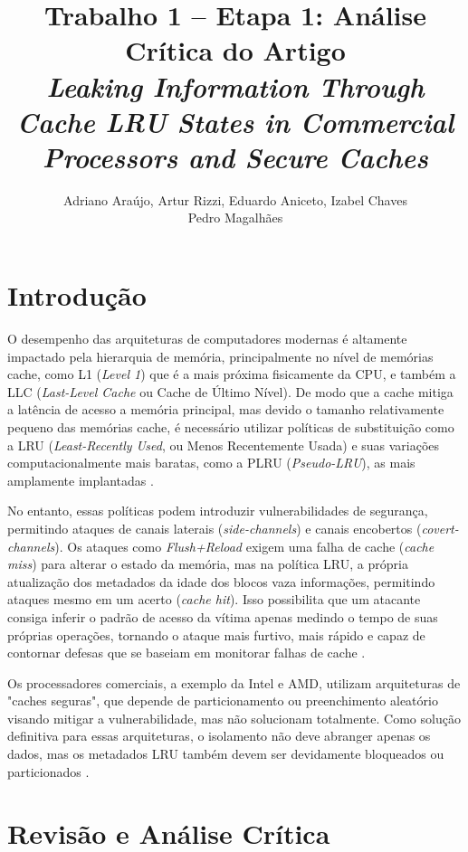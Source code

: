 \documentclass[12pt]{article}
\title{
Trabalho 1 -- Etapa 1: Análise Crítica do Artigo\\[0.2cm]
{\normalsize\itshape Leaking Information Through Cache LRU States in Commercial Processors and Secure Caches \cite{9354935}}
}
\author{Adriano Araújo\inst{1}, Artur Rizzi\inst{1}, Eduardo Aniceto\inst{1}, Izabel Chaves\inst{1}\orcidlink{0009-0008-9198-3909} \\ Pedro Magalhães\inst{1}}
\begin{document}
 

\maketitle

\section{Introdução}

O desempenho das arquiteturas de computadores modernas é altamente impactado pela hierarquia de memória, principalmente no nível de memórias cache, como L1 (\textit{Level 1}) que é a mais próxima fisicamente da CPU, e também a LLC (\textit{Last-Level Cache} ou Cache de Último Nível). De modo que a cache mitiga a latência de acesso a memória principal, mas devido o tamanho relativamente pequeno das memórias cache, é necessário utilizar políticas de substituição como a LRU (\textit{Least-Recently Used}, ou Menos Recentemente Usada) e suas variações computacionalmente mais baratas, como a PLRU (\textit{Pseudo-LRU}), as mais amplamente implantadas \cite{9354935}.

No entanto, essas políticas podem introduzir vulnerabilidades de segurança, permitindo ataques de canais laterais (\textit{side-channels}) e canais encobertos (\textit{covert-channels}). Os ataques como \textit{Flush+Reload} exigem uma falha de cache (\textit{cache miss}) para alterar o estado da memória, mas na política LRU, a própria atualização dos metadados da idade dos blocos vaza informações, permitindo ataques mesmo em um acerto (\textit{cache hit}). Isso possibilita que um atacante consiga inferir o padrão de acesso da vítima apenas medindo o tempo de suas próprias operações, tornando o ataque mais furtivo, mais rápido e capaz de contornar defesas que se baseiam em monitorar falhas de cache \cite{9354935}.

Os processadores comerciais, a exemplo da Intel e AMD, utilizam arquiteturas de "caches seguras", que depende de particionamento ou preenchimento aleatório visando mitigar a vulnerabilidade, mas não solucionam totalmente. Como solução definitiva para essas arquiteturas, o isolamento não deve abranger apenas os dados, mas os metadados LRU também devem ser devidamente bloqueados ou particionados \cite{9354935}.

\section{Revisão e Análise Crítica}
\end{document}
